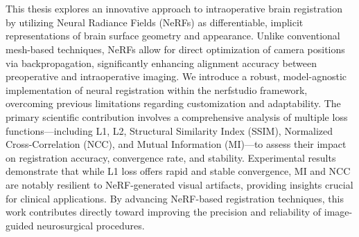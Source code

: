 \chapter{\abstractname}

This thesis explores an innovative approach to intraoperative brain registration by utilizing Neural Radiance Fields (NeRFs) as differentiable, implicit representations of brain surface geometry and appearance. Unlike conventional mesh-based techniques, NeRFs allow for direct optimization of camera positions via backpropagation, significantly enhancing alignment accuracy between preoperative and intraoperative imaging. We introduce a robust, model-agnostic implementation of neural registration within the nerfstudio framework, overcoming previous limitations regarding customization and adaptability. The primary scientific contribution involves a comprehensive analysis of multiple loss functions—including L1, L2, Structural Similarity Index (SSIM), Normalized Cross-Correlation (NCC), and Mutual Information (MI)—to assess their impact on registration accuracy, convergence rate, and stability. Experimental results demonstrate that while L1 loss offers rapid and stable convergence, MI and NCC are notably resilient to NeRF-generated visual artifacts, providing insights crucial for clinical applications. By advancing NeRF-based registration techniques, this work contributes directly toward improving the precision and reliability of image-guided neurosurgical procedures.


\makeatletter
{}
{\renewcommand{\abstractname}{Kurzfassung}}
{\renewcommand{\abstractname}{Abstract}}
\makeatother

\chapter{\abstractname}

